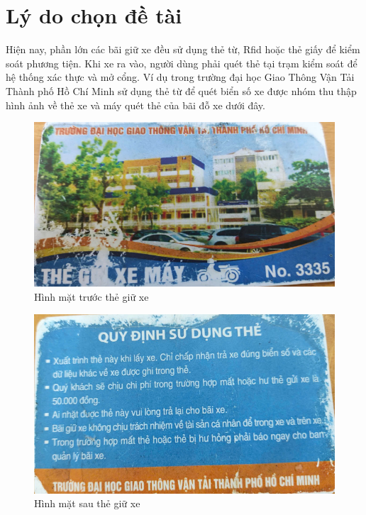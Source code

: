 \section{Lý do chọn đề tài}

Hiện nay, phần lớn các bãi giữ xe đều sử dụng thẻ từ, Rfid hoặc thẻ giấy để kiểm soát phương tiện. Khi xe ra vào, người dùng phải quét thẻ tại trạm kiểm soát để hệ thống xác thực và mở cổng. Ví dụ trong trường đại học Giao Thông Vận Tải Thành phố Hồ Chí Minh sử dụng thẻ từ để quét biển số xe được nhóm thu thập hình ảnh về thẻ xe và máy quét thẻ của bãi đỗ xe dưới đây.

\begin{figure}[H]
    \centering
    \includegraphics[width=1\textwidth]{graphics/main/chapter1/parking_card_front.png}
    \caption{Hình mặt trước thẻ giữ xe}
    \label{fig:thegiu-xe}
\end{figure}

\begin{figure}[H]
    \centering
    \includegraphics[width=1\textwidth]{graphics/main/chapter1/parking_card_back.png}
    \caption{Hình mặt sau thẻ giữ xe}
    \label{fig:thegiu-xe}
\end{figure}
